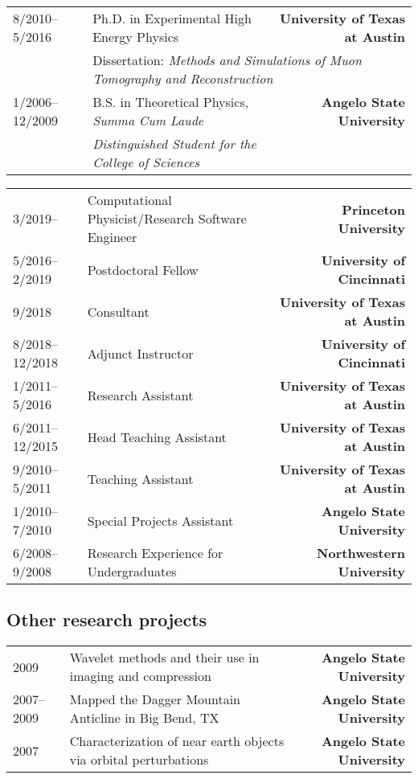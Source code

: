 \documentclass[10pt,letterpaper]{moderncv}
\begin{document}
\let\oldnullthing\null
\renewcommand{\null}{}
\makecvtitle
\renewcommand{\null}{\oldnullthing}
\vspace*{-10mm}


\begin{tabularx}{\textwidth}{p{1.1in}X>{\bfseries}r}
	8/2010--5/2016 & Ph.D. in Experimental High Energy Physics &  University of Texas at Austin \\
	& \multicolumn{2}{l}{Dissertation: \textit{Methods and Simulations of Muon Tomography and Reconstruction}} \\[1ex]
	1/2006--12/2009 & B.S. in Theoretical Physics, \textit{Summa Cum Laude} & Angelo State University \\
	& \textit{Distinguished Student for the College of Sciences} & \\
\end{tabularx}


\begin{tabularx}{\textwidth}{p{1.1in}X>{\bfseries}r}
    3/2019-- & Computational Physicist/Research Software Engineer & Princeton University \\
	5/2016--2/2019 & Postdoctoral Fellow &  University of Cincinnati \\
	9/2018 & Consultant & University of Texas at Austin \\
	8/2018--12/2018 & Adjunct Instructor &  University of Cincinnati \\
	1/2011--5/2016 & Research Assistant & University of Texas at Austin \\
	6/2011--12/2015 & Head Teaching Assistant & University of Texas at Austin \\
	9/2010--5/2011 & Teaching Assistant & University of Texas at Austin \\
	1/2010--7/2010 & Special Projects Assistant & Angelo State University \\
	6/2008--9/2008 & Research Experience for Undergraduates & Northwestern University \\
\end{tabularx}

\subsection{Other research projects}

\begin{tabularx}{\textwidth}{p{1.1in}X>{\bfseries}r}
	2009 & Wavelet methods and their use in imaging and compression &  Angelo State University \\
	2007--2009 & Mapped the Dagger Mountain Anticline in Big Bend, TX & Angelo State University \\
	2007 & Characterization of near earth objects via orbital perturbations & Angelo State University \\
\end{tabularx}
\end{document}
